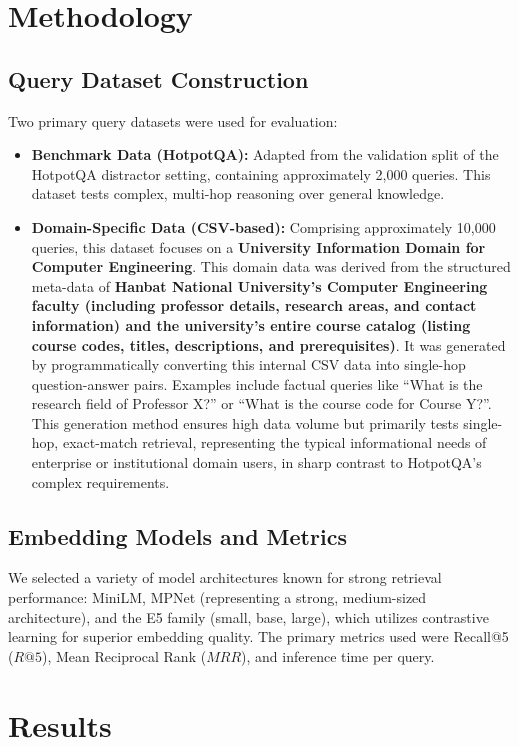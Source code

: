 \documentclass[11pt, a4paper]{article}
\begin{document}
\section{Methodology}

\subsection{Query Dataset Construction}
Two primary query datasets were used for evaluation:
\begin{itemize}
    \item \textbf{Benchmark Data (HotpotQA):} Adapted from the validation split of the HotpotQA distractor setting, containing approximately 2,000 queries. This dataset tests complex, multi-hop reasoning over general knowledge.
    \item \textbf{Domain-Specific Data (CSV-based):} Comprising approximately 10,000 queries, this dataset focuses on a \textbf{University Information Domain for Computer Engineering}. This domain data was derived from the structured meta-data of \textbf{Hanbat National University's Computer Engineering faculty (including professor details, research areas, and contact information) and the university's entire course catalog (listing course codes, titles, descriptions, and prerequisites)}. It was generated by programmatically converting this internal CSV data into single-hop question-answer pairs. Examples include factual queries like “What is the research field of Professor X?” or “What is the course code for Course Y?”. This generation method ensures high data volume but primarily tests single-hop, exact-match retrieval, representing the typical informational needs of enterprise or institutional domain users, in sharp contrast to HotpotQA's complex requirements.
\end{itemize}

\subsection{Embedding Models and Metrics}
We selected a variety of model architectures known for strong retrieval performance: MiniLM, MPNet (representing a strong, medium-sized architecture), and the E5 family (small, base, large), which utilizes contrastive learning for superior embedding quality. The primary metrics used were Recall@5 ($R@5$), Mean Reciprocal Rank ($MRR$), and inference time per query.

\section{Results}
\end{document}
